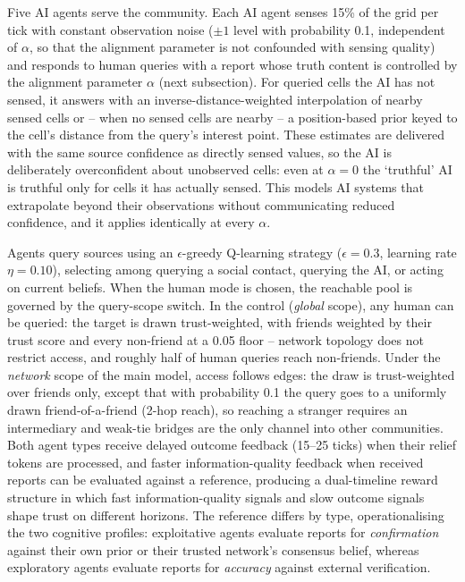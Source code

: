 \documentclass[pdflatex,sn-nature]{sn-jnl}
\begin{document}
Five AI agents serve the community. Each AI agent senses 15\% of the grid per tick with constant observation noise ($\pm 1$ level with probability 0.1, independent of $\alpha$, so that the alignment parameter is not confounded with sensing quality) and responds to human queries with a report whose truth content is controlled by the alignment parameter $\alpha$ (next subsection). For queried cells the AI has not sensed, it answers with an inverse-distance-weighted interpolation of nearby sensed cells or -- when no sensed cells are nearby -- a position-based prior keyed to the cell's distance from the query's interest point. These estimates are delivered with the same source confidence as directly sensed values, so the AI is deliberately overconfident about unobserved cells: even at $\alpha = 0$ the `truthful' AI is truthful only for cells it has actually sensed. This models AI systems that extrapolate beyond their observations without communicating reduced confidence, and it applies identically at every $\alpha$.

Agents query sources using an $\epsilon$-greedy Q-learning strategy ($\epsilon = 0.3$, learning rate $\eta = 0.10$), selecting among querying a social contact, querying the AI, or acting on current beliefs. When the human mode is chosen, the reachable pool is governed by the query-scope switch. In the control (\emph{global} scope), any human can be queried: the target is drawn trust-weighted, with friends weighted by their trust score and every non-friend at a 0.05 floor -- network topology does not restrict access, and roughly half of human queries reach non-friends. Under the \emph{network} scope of the main model, access follows edges: the draw is trust-weighted over friends only, except that with probability 0.1 the query goes to a uniformly drawn friend-of-a-friend (2-hop reach), so reaching a stranger requires an intermediary and weak-tie bridges are the only channel into other communities. Both agent types receive delayed outcome feedback (15--25 ticks) when their relief tokens are processed, and faster information-quality feedback when received reports can be evaluated against a reference, producing a dual-timeline reward structure in which fast information-quality signals and slow outcome signals shape trust on different horizons. %
The reference differs by type, operationalising the two cognitive profiles: exploitative agents evaluate reports for \emph{confirmation} against their own prior or their trusted network's consensus belief, whereas exploratory agents evaluate reports for \emph{accuracy} against external verification.
\end{document}
